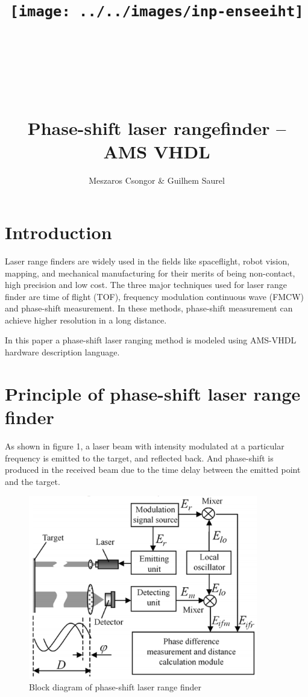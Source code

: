 \documentclass[fleqn]{article}
\title{\texttt{[image: ../../images/inp-enseeiht]} \\ ~ \\ ~ \\ ~ \\ ~ \\ Phase-shift  laser  rangefinder – AMS VHDL}
\author{Meszaros Csongor \& Guilhem Saurel}
\date{\oldstylenums{\today}}
\begin{document}
\begin{titlepage}
    \setcounter{page}{0}
    \maketitle
    \vfill
    \thispagestyle{empty}
\end{titlepage}

\tableofcontents
\newpage

\section{Introduction}

Laser range finders are widely used in the fields like spaceflight, robot vision, mapping, and mechanical manufacturing for their merits of being non-contact, high precision and low cost. The three major techniques used for laser range finder are time of flight (TOF), frequency modulation continuous wave (FMCW) and phase-shift measurement. In these methods, phase-shift measurement can achieve higher resolution in a long distance.

In this paper a phase-shift laser ranging method is modeled using AMS-VHDL hardware description language.

\section{Principle of phase-shift laser range finder}

As shown in figure 1, a laser beam with intensity modulated at a  particular frequency is emitted to the target, and reflected back. And phase-shift is produced in the received beam due to the time delay between the emitted point and the target.

\begin{figure}[h]
    \begin{center}
        \includegraphics[width=10cm]{block.png}
    \end{center}
    \caption{Block diagram of phase-shift laser range finder}
\end{figure}
\end{document}

